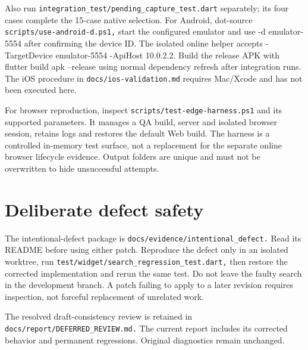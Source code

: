 \documentclass[12pt,a4paper,oneside]{report}
\begin{document}
Also run \nolinkurl{integration_test/pending_capture_test.dart} separately; its four cases complete the 15-case native selection. For Android, dot-source \nolinkurl{scripts/use-android-d.ps1,} start the configured emulator and use -d emulator-5554 after confirming the device ID. The isolated online helper accepts -TargetDevice emulator-5554 -ApiHost 10.0.2.2. Build the release APK with flutter build apk --release using normal dependency refresh after integration runs. The iOS procedure in \nolinkurl{docs/ios-validation.md} requires Mac/Xcode and has not been executed here.

For browser reproduction, inspect \nolinkurl{scripts/test-edge-harness.ps1} and its supported parameters. It manages a QA build, server and isolated browser session, retains logs and restores the default Web build. The harness is a controlled in-memory test surface, not a replacement for the separate online browser lifecycle evidence. Output folders are unique and must not be overwritten to hide unsuccessful attempts.

\section{Deliberate defect safety}
The intentional-defect package is \nolinkurl{docs/evidence/intentional_defect.} Read its README before using either patch. Reproduce the defect only in an isolated worktree, run \nolinkurl{test/widget/search_regression_test.dart,} then restore the corrected implementation and rerun the same test. Do not leave the faulty search in the development branch. A patch failing to apply to a later revision requires inspection, not forceful replacement of unrelated work.

The resolved draft-consistency review is retained in \nolinkurl{docs/report/DEFERRED_REVIEW.md.} The current report includes its corrected behavior and permanent regressions. Original diagnostics remain unchanged.
\end{document}
